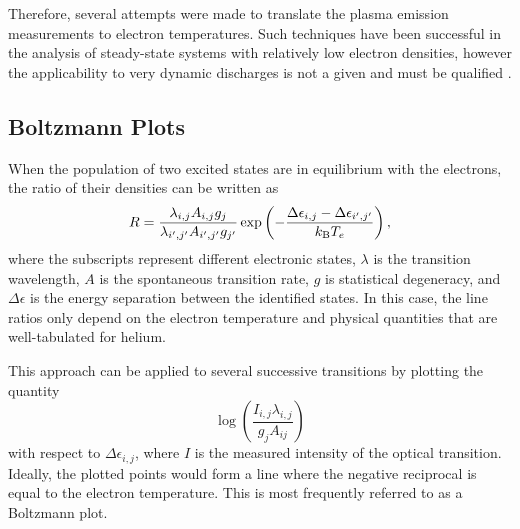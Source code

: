 Therefore, several attempts were made to translate the plasma emission
measurements to electron temperatures. Such techniques have been successful in
the analysis of steady-state systems with relatively low electron densities,
however the applicability to very dynamic discharges is not a given and must be
qualified \cite{Kunze2009}. 

\subsection{Boltzmann Plots}

When the population of two excited states are in equilibrium with the electrons,
the ratio of their densities can be written as \cite{Griem2005}
\begin{equation}
  R = \frac{\lambda_{i,j}A_{i,j}g_j}{\lambda_{i',j'}A_{i',j'}g_{j'}}
      \exp\left( -\frac{\Delta\epsilon_{i,j} - \Delta\epsilon_{i',j'}}
                       {k_\mathrm{B} T_e} \right),
\end{equation}
where the subscripts represent different electronic states, $\lambda$ is the
transition wavelength, $A$ is the spontaneous transition rate, $g$ is
statistical degeneracy, and $\Delta\epsilon$ is the energy separation between
the identified states. In this case, the line ratios only depend on the electron
temperature and physical quantities that are well-tabulated for helium.

This approach can be applied to several successive transitions by plotting the
quantity
\begin{equation}
  \log\left(\frac{I_{i,j}\lambda_{i,j}}{g_jA_{ij}}\right)
\end{equation}
with respect to $\Delta\epsilon_{i,j}$, where $I$ is the measured intensity of
the optical transition. Ideally, the plotted points would form a line where the
negative reciprocal is equal to the electron temperature. This is most
frequently referred to as a Boltzmann plot. 

